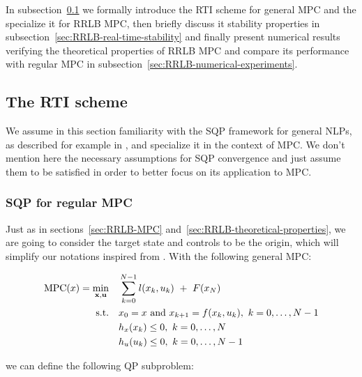 \documentclass[12pt]{article}
\begin{document}
In subsection~\ref{sec:RTI-scheme} we formally introduce the RTI scheme for general MPC and the specialize it for RRLB MPC, then briefly discuss it stability properties in subsection~\ref{sec:RRLB-real-time-stability} and finally present numerical results verifying the theoretical properties of RRLB MPC and compare its performance with regular MPC in subsection~\ref{sec:RRLB-numerical-experiments}.

\subsection{The RTI scheme}\label{sec:RTI-scheme}

We assume in this section familiarity with the SQP framework for general NLPs, as described for example in \cite{nocedal-wright}, and specialize it in the context of MPC.
We don't mention here the necessary assumptions for SQP convergence and just assume them to be satisfied in order to better focus on its application to MPC.

\subsubsection{SQP for regular MPC}

Just as in sections~\ref{sec:RRLB-MPC} and~\ref{sec:RRLB-theoretical-properties}, we are going to consider the target state and controls to be the origin, which will simplify our notations inspired from \cite{mpc-rti}.
With the following general MPC:

\begin{align*}
	\mathrm{MPC}(x)=\underset{\bf{x},\bf{u}}{\min} &\quad \sum_{k=0}^{N-1}l(x_k,u_k)~+~F(x_N)\\
	\text{s.t.} &\quad x_0=x\text{ and }x_{k+1}=f(x_k,u_k),~k=0,\ldots,N-1\\
	&\quad h_x(x_k)\leq 0,~k=0,\ldots,N\\
	&\quad h_u(u_k)\leq 0,~k=0,\ldots,N-1
\end{align*}

\noindent we can define the following QP subproblem:
\end{document}
